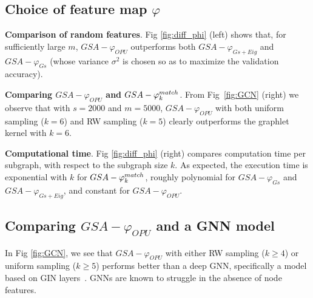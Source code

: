 \documentclass{article}
\begin{document}
\subsection{Choice of feature map $\varphi$}
\textbf{Comparison of random features}. Fig \ref{fig:diff_phi} (left) shows  that, for sufficiently large $m$, $GSA-\varphi_{OPU}$  outperforms both $GSA-\varphi_{Gs+Eig}$  and $GSA-\varphi_{Gs}$ (whose variance $\sigma^2$ is chosen so as to maximize the validation accuracy). %

\noindent\textbf{Comparing $GSA-\varphi_{OPU}$ and $GSA-\varphi^{match}_k$}. From Fig~\ref{fig:GCN} (right) we observe that with $s=2000$ and $m=5000$, $GSA-\varphi_{OPU}$ with both uniform sampling ($k=6$) and RW sampling ($k=5$)  clearly outperforms the graphlet kernel %
with $k=6$. %

\noindent\textbf{Computational time}. Fig \ref{fig:diff_phi} (right) compares computation time per subgraph, with respect to the subgraph size $k$. %
As expected, the execution time is exponential with $k$ for $GSA-\varphi^{match}_k$, roughly polynomial for $GSA-\varphi_{Gs}$ and $GSA-\varphi_{Gs+Eig}$, and constant for $GSA-\varphi_{OPU}$.%


\subsection{Comparing $GSA-\varphi_{OPU}$ and a GNN model}\label{sec:vs_GIN}

In Fig \ref{fig:GCN}, we see that $GSA-\varphi_{OPU}$ with either RW sampling  ($k\geq4$) or uniform sampling ($k\geq5$) performs better than a deep GNN, specifically a model based on GIN layers~\cite{GCN_powerful}. GNNs are known to struggle in the absence of node features. %
\end{document}

